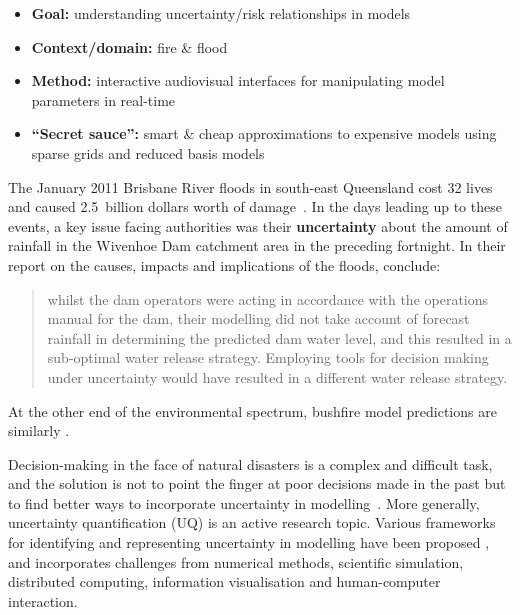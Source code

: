 \documentclass[a4paper,fontsize=12pt]{scrartcl}
\begin{document}
\begin{itemize}
\item \textbf{Goal:} understanding uncertainty/risk relationships in models
\item \textbf{Context/domain:} fire \& flood
\item \textbf{Method:} interactive audiovisual interfaces for
  manipulating model parameters in real-time
\item \textbf{``Secret sauce'':} smart \& cheap approximations to expensive
  models using sparse grids and reduced basis models
\end{itemize}


The January 2011 Brisbane River floods in south-east Queensland cost
32 lives and caused 2.5~billion dollars worth of
damage~\parencite{vandenhonert_2011_2011}. In the days leading up to
these events, a key issue facing authorities was their
\textbf{uncertainty} about the amount of rainfall in the Wivenhoe Dam
catchment area in the preceding fortnight. In their report on the
causes, impacts and implications of the floods,
\textcite[p1170]{vandenhonert_2011_2011} conclude: \blockquote{whilst
  the dam operators were acting in accordance with the operations
  manual for the dam, their modelling did not take account of forecast
  rainfall in determining the predicted dam water level, and this
  resulted in a sub-optimal water release strategy. Employing tools
  for decision making under uncertainty would have resulted in a
  different water release strategy.}
At the other end of the environmental spectrum, bushfire model
predictions are similarly .

Decision-making in the face of natural disasters is a complex and
difficult task, and the solution is not to point the finger at poor
decisions made in the past but to find better ways to incorporate
uncertainty in modelling~\parencite{thompson_social_2014-1}. More
generally, uncertainty quantification (UQ)
is an active research topic. Various frameworks for identifying and
representing uncertainty in modelling have been
proposed \parencite[for
example]{neale_navigating_2015,maceachren_visual_2015,bonneau_overview_2014}, and incorporates challenges from numerical methods,
scientific simulation, distributed computing, information
visualisation and human-computer interaction. 
\end{document}
